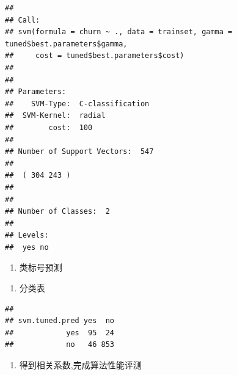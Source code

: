 \documentclass[
]{article}
\newenvironment{Shaded}{\begin{snugshade}}{\end{snugshade}}
\newcommand{\KeywordTok}[1]{\textcolor[rgb]{0.13,0.29,0.53}{\textbf{#1}}}
\newcommand{\NormalTok}[1]{#1}
\newcommand{\OperatorTok}[1]{\textcolor[rgb]{0.81,0.36,0.00}{\textbf{#1}}}
\newcommand{\StringTok}[1]{\textcolor[rgb]{0.31,0.60,0.02}{#1}}
\providecommand{\tightlist}{%
  \setlength{\itemsep}{0pt}\setlength{\parskip}{0pt}}
\begin{document}
\begin{verbatim}
## 
## Call:
## svm(formula = churn ~ ., data = trainset, gamma = tuned$best.parameters$gamma, 
##     cost = tuned$best.parameters$cost)
## 
## 
## Parameters:
##    SVM-Type:  C-classification 
##  SVM-Kernel:  radial 
##        cost:  100 
## 
## Number of Support Vectors:  547
## 
##  ( 304 243 )
## 
## 
## Number of Classes:  2 
## 
## Levels: 
##  yes no
\end{verbatim}

\begin{enumerate}
\def\labelenumi{\arabic{enumi}.}
\setcounter{enumi}{3}
\tightlist
\item
  类标号预测
\end{enumerate}

\begin{Shaded}
\end{Shaded}

\begin{enumerate}
\def\labelenumi{\arabic{enumi}.}
\setcounter{enumi}{4}
\tightlist
\item
  分类表
\end{enumerate}

\begin{Shaded}
\end{Shaded}

\begin{verbatim}
##               
## svm.tuned.pred yes  no
##            yes  95  24
##            no   46 853
\end{verbatim}

\begin{enumerate}
\def\labelenumi{\arabic{enumi}.}
\setcounter{enumi}{5}
\tightlist
\item
  得到相关系数,完成算法性能评测
\end{enumerate}
\end{document}
